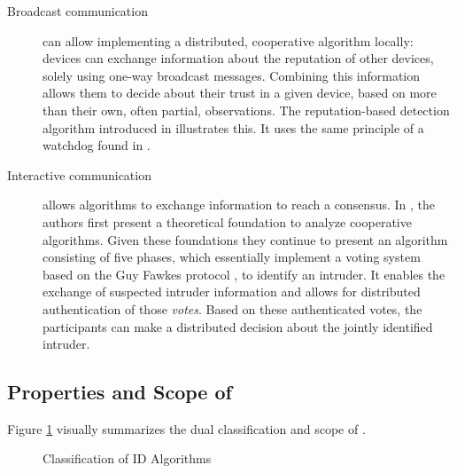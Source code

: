\documentclass[3p,times,procedia]{elsarticle}
\begin{document}
\begin{description}

  \item[Broadcast communication] can allow implementing a distributed,
  cooperative algorithm locally: devices can exchange information about the
  reputation of other devices, solely using one-way broadcast messages.
  Combining this information allows them to decide about their trust in a given
  device, based on more than their own, often partial, observations. The
  reputation-based detection algorithm introduced in
  \cite{ganeriwal2008reputation} illustrates this. It uses the same principle
  of a watchdog found in \cite{mishra2004intrusion}.

  \item[Interactive communication] allows algorithms to exchange information to
  reach a consensus. In \cite{krontiris2009cooperative}, the authors first
  present a theoretical foundation to analyze cooperative algorithms. Given
  these foundations they continue to present an algorithm consisting of five
  phases, which essentially implement a voting system based on the Guy Fawkes
  protocol \cite{anderson1998new}, to identify an intruder. It enables the
  exchange of suspected intruder information and allows for distributed
  authentication of those \emph{votes}. Based on these authenticated votes, the
  participants can make a distributed decision about the jointly identified
  intruder.

\end{description}

\subsection{Properties and Scope of \NAME}
\label{scope}

Figure \ref{fig:classification} visually summarizes the dual classification and
scope of \NAME.

\begin{figure}[t]
  \centering
  \caption{Classification of ID Algorithms}
  \label{fig:classification}
\end{figure}
\end{document}
